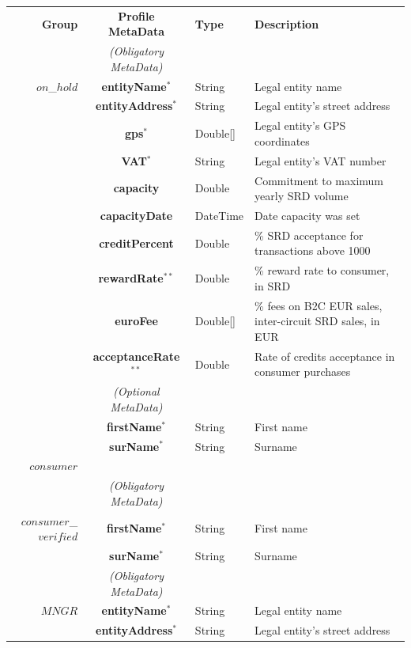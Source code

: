 \setlength{\tabcolsep}{5pt}
\begin{table}[H]
\begin{centering}
\small
{
\begin{tabular}{ r | c | l | l }
\hline
\textbf{Group}	& {\bf Profile MetaData} & {\bf Type} & {\bf Description} \\
\Xhline{1.5pt}
			& \emph{(Obligatory MetaData)} & & \\
\cline{2-2}
$on$\_$hold$	& {\bf entityName}$^*$		&String	& Legal entity name \\
			& {\bf entityAddress}$^*$		&String	& Legal entity's street address \\
			& {\bf gps}$^*$				&Double[]	& Legal entity's GPS coordinates \\
			& {\bf VAT}$^*$				&String	& Legal entity's VAT number \\
			& {\bf capacity}				&Double	& Commitment to maximum yearly SRD volume \\
			& {\bf capacityDate}			&DateTime & Date capacity was set \\
			& {\bf creditPercent}			&Double	& \% SRD acceptance for transactions above 1000 \\
			& {\bf rewardRate}$^{**}$		&Double	& \% reward rate to consumer, in SRD \\
			& {\bf euroFee}				&Double[]	& \% fees on B2C EUR sales, inter-circuit SRD sales, in EUR \\			& {\bf acceptanceRate}$^{**}$	&Double	& Rate of credits acceptance in consumer purchases\\
\cline{2-2}
			 & \emph{(Optional MetaData)}& & \\
\cline{2-2}
			& {\bf firstName}$^*$			&String	& First name \\
			& {\bf surName}$^*$			&String	& Surname \\
\Xhline{1.5pt}
$consumer$	& 	& &  \\
\Xhline{1.5pt}
			& \emph{(Obligatory MetaData)} & & \\
\cline{2-2}
$consumer$\_$verified$ & {\bf firstName}$^*$	&String	& First name \\
			& {\bf surName}$^*$			&String	& Surname \\
\Xhline{1.5pt}
			& \emph{(Obligatory MetaData)} & & \\
\cline{2-2}
$MNGR$ 		& {\bf entityName}$^*$		&String	& Legal entity name \\
			& {\bf entityAddress}$^*$		&String	& Legal entity's street address \\

\end{tabular}}
\end{centering}
\end{table}
